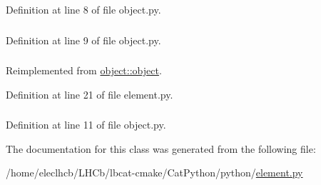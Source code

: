 Definition at line 8 of file object.py.\hypertarget{classobject_1_1object_a15f13858ecdbf661a97a7da93d717922}{
\subsubsection[{obj}]{}}
\label{classobject_1_1object_a15f13858ecdbf661a97a7da93d717922}


Definition at line 9 of file object.py.\hypertarget{classelement_1_1element_abadf93bb1b1fa6f5fdd00dde996d0f2c}{
\subsubsection[{panel}]{}}
\label{classelement_1_1element_abadf93bb1b1fa6f5fdd00dde996d0f2c}


Reimplemented from \hyperlink{classobject_1_1object_add82cb657066d4ab5b39035792971503}{object::object}.

Definition at line 21 of file element.py.\hypertarget{classobject_1_1object_a6b4e1fd053496eafff2bc0f8aed7f089}{
\subsubsection[{path}]{}}
\label{classobject_1_1object_a6b4e1fd053496eafff2bc0f8aed7f089}


Definition at line 11 of file object.py.

The documentation for this class was generated from the following file:\begin{DoxyCompactItemize}
\item 
/home/eleclhcb/LHCb/lbcat-\/cmake/CatPython/python/\hyperlink{element_8py}{element.py}\end{DoxyCompactItemize}
